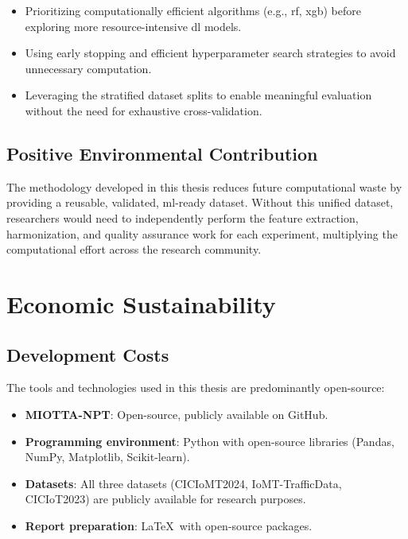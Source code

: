 \begin{itemize}
    \item Prioritizing computationally efficient algorithms (e.g., \gls{rf}, \gls{xgb}) before exploring more resource-intensive \gls{dl} models.
    \item Using early stopping and efficient hyperparameter search strategies to avoid unnecessary computation.
    \item Leveraging the stratified dataset splits to enable meaningful evaluation without the need for exhaustive cross-validation.
\end{itemize}

\subsection{Positive Environmental Contribution}

The methodology developed in this thesis reduces future computational waste by providing a reusable, validated, \gls{ml}-ready dataset. Without this unified dataset, researchers would need to independently perform the feature extraction, harmonization, and quality assurance work for each experiment, multiplying the computational effort across the research community.

\section{Economic Sustainability}
\label{sec:economic}

\subsection{Development Costs}

The tools and technologies used in this thesis are predominantly open-source:

\begin{itemize}
    \item \textbf{MIOTTA-NPT}: Open-source, publicly available on GitHub.
    \item \textbf{Programming environment}: Python with open-source libraries (Pandas, NumPy, Matplotlib, Scikit-learn).
    \item \textbf{Datasets}: All three datasets (CICIoMT2024, IoMT-TrafficData, CICIoT2023) are publicly available for research purposes.
    \item \textbf{Report preparation}: \LaTeX\ with open-source packages.
\end{itemize}

